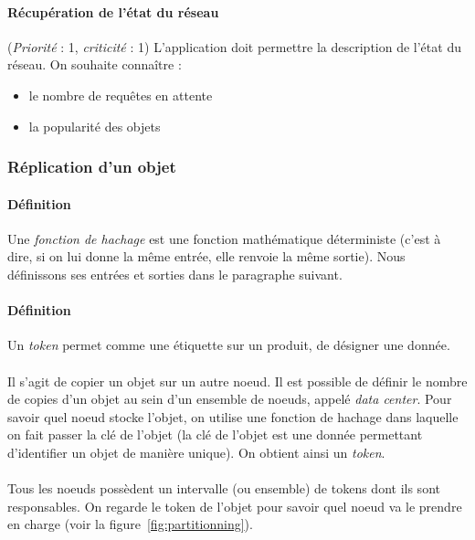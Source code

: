 \documentclass[12pt]{article}
\newcommand{\besoin}[2] {
  (\textit{Priorité} : #1, \textit{criticité} : #2)
}
\begin{document}
\paragraph{Récupération de l'état du réseau} \besoin{1}{1} L'application doit permettre la description de l'état du réseau.
On souhaite connaître : 
\begin{itemize}
 \item le nombre de requêtes en attente
 \item la popularité des objets
\end{itemize}

\subsubsection{Réplication d'un objet}


\paragraph{Définition} Une \textit{fonction de hachage} est une fonction mathématique déterministe (c'est à dire, si on lui donne la même entrée, elle renvoie la même sortie). Nous définissons ses entrées et sorties dans le paragraphe suivant.

\paragraph{Définition} Un \textit{token} permet comme une étiquette sur un produit, de désigner une donnée.

\paragraph{} Il s'agit de copier un objet sur un autre noeud. 
Il est possible de définir le nombre de copies d'un objet au sein d'un ensemble de noeuds, appelé \textit{data center}. 
Pour savoir quel noeud stocke l'objet, on utilise une fonction de hachage dans laquelle on fait passer la clé de l'objet (la clé de l'objet est une donnée permettant d'identifier un objet de manière unique).
On obtient ainsi un \textit{token}.

\paragraph{} Tous les noeuds possèdent un intervalle (ou ensemble) de tokens dont ils sont responsables. 
On regarde le token de l'objet pour savoir quel noeud va le prendre en charge (voir la figure~\ref{fig:partitionning}).
\end{document}
